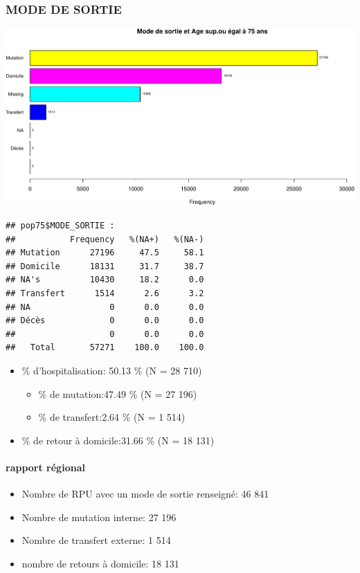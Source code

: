 \documentclass[]{article}
\begin{document}
\subsubsection{MODE DE SORTIE}\label{mode-de-sortie-1}

\includegraphics{Figs/sortie75-1.pdf}

\begin{verbatim}
## pop75$MODE_SORTIE : 
##           Frequency   %(NA+)   %(NA-)
## Mutation      27196     47.5     58.1
## Domicile      18131     31.7     38.7
## NA's          10430     18.2      0.0
## Transfert      1514      2.6      3.2
## NA                0      0.0      0.0
## Décès             0      0.0      0.0
##                   0      0.0      0.0
##   Total       57271    100.0    100.0
\end{verbatim}

\begin{itemize}
\itemsep1pt\parskip0pt
\item
  \% d'hospitalisation: 50.13 \% (N = 28 710)

  \begin{itemize}
  \itemsep1pt\parskip0pt
  \item
    \% de mutation:47.49 \% (N = 27 196)
  \item
    \% de transfert:2.64 \% (N = 1 514)
  \end{itemize}
\item
  \% de retour à domicile:31.66 \% (N = 18 131)
\end{itemize}

\paragraph{rapport régional}\label{rapport-regional}

\begin{itemize}
\itemsep1pt\parskip0pt
\item
  Nombre de RPU avec un mode de sortie renseigné: 46 841
\item
  Nombre de mutation interne: 27 196
\item
  Nombre de transfert externe: 1 514
\item
  nombre de retours à domicile: 18 131
\end{itemize}
\end{document}
